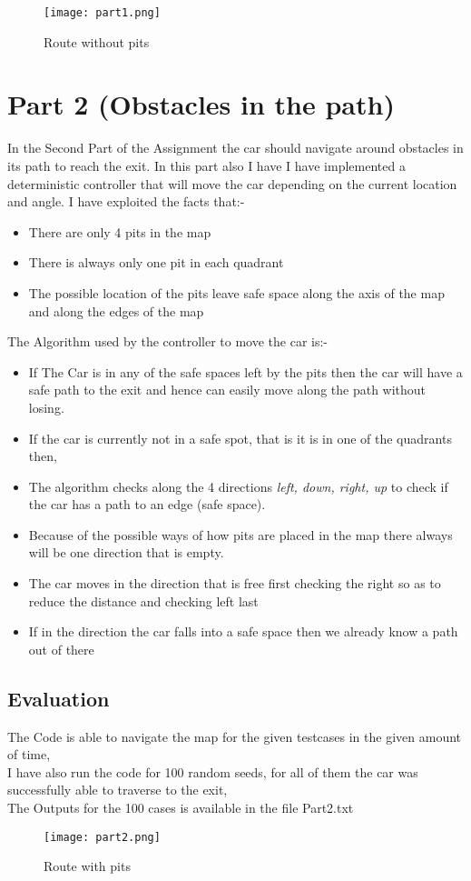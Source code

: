 \documentclass[10pt]{article}
\begin{document}
    \begin{figure}[H]
        \centering
        \texttt{[image: part1.png]}
        \caption{Route without pits}
    \end{figure}
    
    
\section{Part 2 (Obstacles in the path)}

In the Second Part of the Assignment the car should navigate around obstacles in its path to reach the exit.
In this part also I have I have implemented a deterministic controller that will move the car depending on the current location and angle.
I have exploited the facts that:-
\begin{itemize}
    \item There are only 4 pits in the map
    \item There is always only one pit in each quadrant
    \item The possible location of the pits leave safe space along the axis of the map and along the edges of the map
\end{itemize}

The Algorithm used by the controller to move the car is:-
\begin{itemize}
    \item If The Car is in any of the safe spaces left by the pits then the car will have a safe path to the exit and hence can easily move along the path without losing.
    \item If the car is currently not in a safe spot, that is it is in one of the quadrants then, 
    \item The algorithm checks along the 4 directions \textit{left, down, right, up} to check if the car has a path to an edge (safe space).
    \item Because of the possible ways of how pits are placed in the map there always will be one direction that is empty.
    \item The car moves in the direction that is free first checking the right so as to reduce the distance and checking left last
    \item If in the direction the car falls into a safe space then we already know a path out of there
\end{itemize}

\subsection{Evaluation}
The Code is able to navigate the map for the given testcases in the given amount of time,
\\ I have also run the code for 100 random seeds, for all of them the car was successfully able to traverse to the exit,
\\ The Outputs for the 100 cases is available in the file Part2.txt
\begin{figure}[H]
    \centering
    \texttt{[image: part2.png]}
    \caption{Route with pits}
\end{figure}
\end{document}
